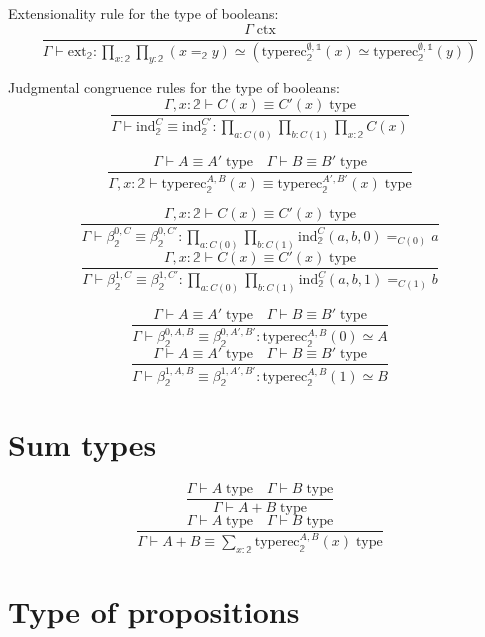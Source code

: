 \documentclass{book}
\begin{document}
Extensionality rule for the type of booleans:
$$\frac{\Gamma \; \mathrm{ctx}}{\Gamma \vdash \mathrm{ext}_\mathbb{2}:\prod_{x:\mathbb{2}} \prod_{y:\mathbb{2}} (x =_{\mathbb{2}} y) \simeq (\mathrm{typerec}_\mathbb{2}^{\emptyset, \mathbb{1}}(x) \simeq \mathrm{typerec}_\mathbb{2}^{\emptyset, \mathbb{1}}(y))}$$

Judgmental congruence rules for the type of booleans:
$$\frac{\Gamma, x:\mathbb{2} \vdash C(x) \equiv C'(x) \; \mathrm{type}}{\Gamma \vdash \mathrm{ind}_\mathbb{2}^C \equiv \mathrm{ind}_\mathbb{2}^{C'}:\prod_{a:C(0)} \prod_{b:C(1)} \prod_{x:\mathbb{2}} C(x)}$$

$$\frac{\Gamma \vdash A \equiv A' \; \mathrm{type} \quad \Gamma \vdash B \equiv B' \; \mathrm{type}}{\Gamma, x:\mathbb{2} \vdash \mathrm{typerec}_\mathbb{2}^{A, B}(x) \equiv \mathrm{typerec}_\mathbb{2}^{A', B'}(x) \; \mathrm{type}}$$

$$\frac{\Gamma, x:\mathbb{2} \vdash C(x) \equiv C'(x) \; \mathrm{type}}{\Gamma \vdash \beta_\mathbb{2}^{0, C} \equiv \beta_\mathbb{2}^{0, C'}:\prod_{a:C(0)} \prod_{b:C(1)} \mathrm{ind}_\mathbb{2}^C(a, b, 0) =_{C(0)} a}$$
$$\frac{\Gamma, x:\mathbb{2} \vdash C(x) \equiv C'(x) \; \mathrm{type}}{\Gamma \vdash \beta_\mathbb{2}^{1, C} \equiv \beta_\mathbb{2}^{1, C'}:\prod_{a:C(0)} \prod_{b:C(1)} \mathrm{ind}_\mathbb{2}^C(a, b, 1) =_{C(1)} b}$$

$$\frac{\Gamma \vdash A \equiv A' \; \mathrm{type} \quad \Gamma \vdash B \equiv B' \; \mathrm{type}}{\Gamma \vdash \beta_\mathbb{2}^{0, A, B} \equiv \beta_\mathbb{2}^{0, A', B'}:\mathrm{typerec}_\mathbb{2}^{A, B}(0) \simeq A}$$
$$\frac{\Gamma \vdash A \equiv A' \; \mathrm{type} \quad \Gamma \vdash B \equiv B' \; \mathrm{type}}{\Gamma \vdash \beta_\mathbb{2}^{1, A, B} \equiv \beta_\mathbb{2}^{1, A', B'}:\mathrm{typerec}_\mathbb{2}^{A, B}(1) \simeq B}$$

\section{Sum types}
$$\frac{\Gamma \vdash A \; \mathrm{type} \quad \Gamma \vdash B \; \mathrm{type}}{\Gamma \vdash A + B \; \mathrm{type}}$$
$$\frac{\Gamma \vdash A \; \mathrm{type} \quad \Gamma \vdash B \; \mathrm{type}}{\Gamma \vdash A + B \equiv \sum_{x:\mathbb{2}} \mathrm{typerec}_\mathbb{2}^{A, B}(x) \; \mathrm{type}}$$

\section{Type of propositions}
\end{document}
